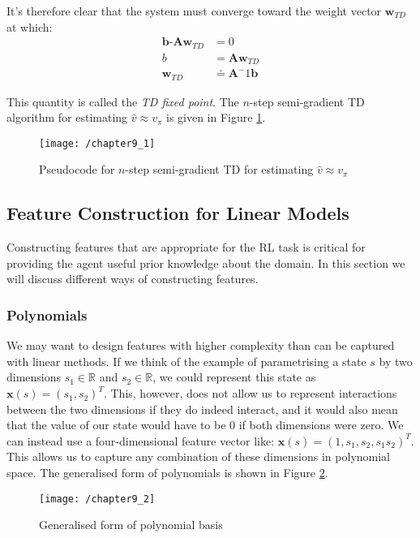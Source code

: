 It's therefore clear that the system must converge toward the weight vector $\textbf{w}_{TD}$ at which:
\begin{align}
\textbf{b-Aw}_{TD} &= 0 \\
b &= \textbf{Aw}_{TD} \\
\textbf{w}_{TD} &\doteq \textbf{A}^-1\textbf{b}
\end{align}

This quantity is called the \textit{TD fixed point}. The $n$-step semi-gradient TD algorithm for estimating $\hat{v} \approx v_\pi$ is given in Figure \ref{fig: n-step algo}.

\begin{figure}
	\centering
	\texttt{[image: /chapter9\_1]}
	\caption{Pseudocode for $n$-step semi-gradient TD for estimating $\hat{v} \approx v_\pi$}
	\label{fig: n-step algo}
\end{figure}

\subsection{Feature Construction for Linear Models}
Constructing features that are appropriate for the RL task is critical for providing the agent useful prior knowledge about the domain. In this section we will discuss different ways of constructing features.

\subsubsection{Polynomials}
We may want to design features with higher complexity than can be captured with linear methods. If we think of the example of parametrising a state $s$ by two dimensions $s_1 \in \mathbb{R}$ and $s_2 \in \mathbb{R}$, we could represent this state as $\textbf{x}(s) = (s_1, s_2)^T$. This, however, does not allow us to represent interactions between the two dimensions if they do indeed interact, and it would also mean that the value of our state would have to be 0 if both dimensions were zero. We can instead use a four-dimensional feature vector like: $\textbf{x}(s) = (1, s_1, s_2, s_1s_2)^T$. This allows us to capture any combination of these dimensions in polynomial space. The generalised form of polynomials is shown in Figure \ref{fig: poly}.

\begin{figure}
	\centering
	\texttt{[image: /chapter9\_2]}
	\caption{Generalised form of polynomial basis}
	\label{fig: poly}
\end{figure}


